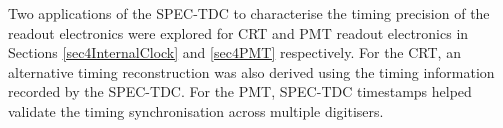 Two applications of the SPEC-TDC to characterise the timing precision of the readout electronics were explored for CRT and PMT readout electronics in Sections \ref{sec4InternalClock} and \ref{sec4PMT} respectively.
For the CRT, an alternative timing reconstruction was also derived using the timing information recorded by the SPEC-TDC.
For the PMT, SPEC-TDC timestamps helped validate the timing synchronisation across multiple digitisers. 




